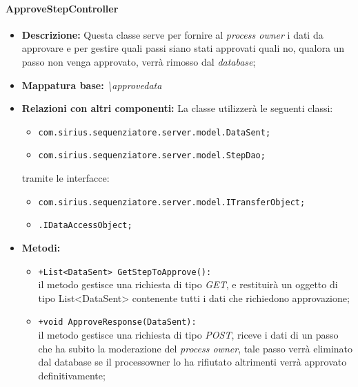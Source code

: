 \paragraph{ApproveStepController}%
\begin{itemize}
	\item \textbf{Descrizione: } Questa classe serve per fornire al \textit{process owner} i dati da approvare e per gestire quali passi siano stati approvati quali no, qualora un passo non venga approvato, verrà rimosso dal \textit{database};
	\item \textbf{Mappatura base: } \textit{\textbackslash approvedata}
	\item \textbf{Relazioni con altri componenti: }
	La classe utilizzerà le seguenti classi:
	\begin{itemize}
		\item \texttt{com.sirius.sequenziatore.server.model.DataSent;}
		\item \texttt{com.sirius.sequenziatore.server.model.StepDao;}
	\end{itemize}
	tramite le interfacce:
	\begin{itemize}
		\item \texttt{com.sirius.sequenziatore.server.model.ITransferObject;}
		\item \texttt{\sModel .IDataAccessObject;}
	\end{itemize}
	\item \textbf{Metodi: }\begin{itemize}
					\item \texttt{+List<DataSent> GetStepToApprove():}\\
					 il metodo gestisce una richiesta di tipo \textit{GET}, e restituirà un oggetto di tipo List<DataSent> contenente tutti i dati che richiedono approvazione;
					\item \texttt{+void ApproveResponse(DataSent):}\\
					il metodo gestisce una richiesta di tipo \textit{POST}, riceve i dati di un passo che ha subito la moderazione del \textit{process owner}, tale passo verrà eliminato dal database se il processowner lo ha rifiutato altrimenti verrà approvato definitivamente;  
				\end{itemize}
\end{itemize}